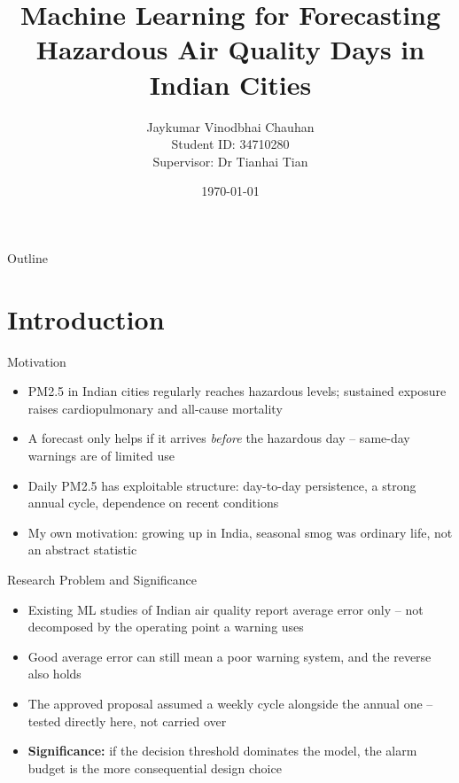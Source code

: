 \documentclass[12pt,aspectratio=169]{beamer}
\title{Machine Learning for Forecasting Hazardous Air Quality Days in Indian Cities}
\author{Jaykumar Vinodbhai Chauhan \\ \small Student ID: 34710280 \\ Supervisor: Dr Tianhai Tian}
\institute{School of Mathematics, Monash University \\ MTH5000 Masters Research Project}
\date{\today}
\begin{document}
\begin{frame}
  \titlepage
\end{frame}

\begin{frame}{Outline}
  \tableofcontents
\end{frame}

\section{Introduction}

\begin{frame}{Motivation}
  \begin{itemize}
    \item PM2.5 in Indian cities regularly reaches hazardous levels;
      sustained exposure raises cardiopulmonary and all-cause mortality
    \item A forecast only helps if it arrives \emph{before} the hazardous
      day -- same-day warnings are of limited use
    \item Daily PM2.5 has exploitable structure: day-to-day persistence, a
      strong annual cycle, dependence on recent conditions
    \item My own motivation: growing up in India, seasonal smog was
      ordinary life, not an abstract statistic
  \end{itemize}
\end{frame}

\begin{frame}{Research Problem and Significance}
  \begin{itemize}
    \item Existing ML studies of Indian air quality report average error
      only -- not decomposed by the operating point a warning uses
    \item Good average error can still mean a poor warning system, and
      the reverse also holds
    \item The approved proposal assumed a weekly cycle alongside the
      annual one -- tested directly here, not carried over
    \item \textbf{Significance:} if the decision threshold dominates the
      model, the alarm budget is the more consequential design choice
  \end{itemize}
\end{frame}
\end{document}
